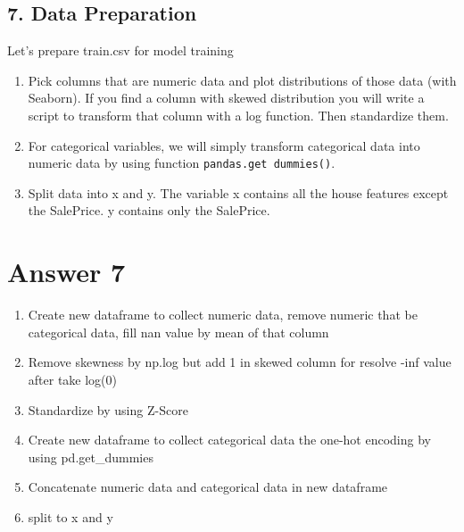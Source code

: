 \documentclass[11pt]{article}
\providecommand{\tightlist}{%
      \setlength{\itemsep}{0pt}\setlength{\parskip}{0pt}}
\begin{document}
    \subsection{7. Data Preparation}\label{data-preparation}

Let's prepare train.csv for model training

\begin{enumerate}
\def\labelenumi{\arabic{enumi}.}
\tightlist
\item
  Pick columns that are numeric data and plot distributions of those
  data (with Seaborn). If you find a column with skewed distribution you
  will write a script to transform that column with a log function. Then
  standardize them.
\item
  For categorical variables, we will simply transform categorical data
  into numeric data by using function \texttt{pandas.get\ dummies()}.
\item
  Split data into x and y. The variable x contains all the house
  features except the SalePrice. y contains only the SalePrice.
\end{enumerate}

    \section{Answer 7}\label{answer-7}

\begin{enumerate}
\def\labelenumi{\arabic{enumi}.}
\tightlist
\item
  Create new dataframe to collect numeric data, remove numeric that be
  categorical data, fill nan value by mean of that column
\item
  Remove skewness by np.log but add 1 in skewed column for resolve -inf
  value after take log(0)
\item
  Standardize by using Z-Score
\item
  Create new dataframe to collect categorical data the one-hot encoding
  by using pd.get\_dummies
\item
  Concatenate numeric data and categorical data in new dataframe
\item
  split to x and y
\end{enumerate}
\end{document}
